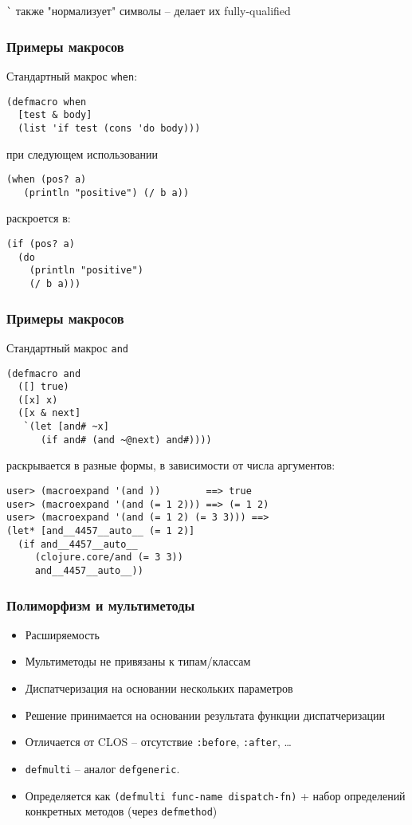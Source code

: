 \documentclass[ignorenonframetext]{beamer}
\begin{document}
\lstinline!`! также "нормализует" символы -- делает их fully-qualified

\begin{frame}[fragile,t]
  \frametitle{Примеры макросов}
Стандартный макрос \texttt{when}:
\begin{lstlisting}
(defmacro when
  [test & body]
  (list 'if test (cons 'do body)))  
\end{lstlisting}
при следующем использовании
\begin{lstlisting}
(when (pos? a) 
   (println "positive") (/ b a))
\end{lstlisting}
раскроется в:
\begin{lstlisting}
(if (pos? a) 
  (do 
    (println "positive") 
    (/ b a)))
\end{lstlisting}
\end{frame}

\begin{frame}[fragile,t]
  \frametitle{Примеры макросов}
Стандартный макрос \texttt{and}
\begin{lstlisting}
(defmacro and
  ([] true)
  ([x] x)
  ([x & next]
   `(let [and# ~x]
      (if and# (and ~@next) and#))))  
\end{lstlisting}
раскрывается в разные формы, в зависимости от числа аргументов:
\begin{lstlisting}
user> (macroexpand '(and ))        ==> true
user> (macroexpand '(and (= 1 2))) ==> (= 1 2)
user> (macroexpand '(and (= 1 2) (= 3 3))) ==>
(let* [and__4457__auto__ (= 1 2)] 
  (if and__4457__auto__ 
     (clojure.core/and (= 3 3)) 
     and__4457__auto__))
\end{lstlisting}
\end{frame}

\begin{frame}[fragile]
  \frametitle{Полиморфизм и мультиметоды}
  \begin{itemize}
  \item Расширяемость
  \item Мультиметоды не привязаны к типам/классам
  \item Диспатчеризация на основании нескольких параметров
  \item Решение принимается на основании результата функции диспатчеризации
  \item Отличается от CLOS -- отсутствие \texttt{:before}, \texttt{:after}, \ldots{}
  \item \texttt{defmulti} -- аналог \texttt{defgeneric}.
  \item Определяется как \lstinline!(defmulti func-name dispatch-fn)! + набор определений
    конкретных методов (через \texttt{defmethod})
  \end{itemize}
\end{frame}
\end{document}
